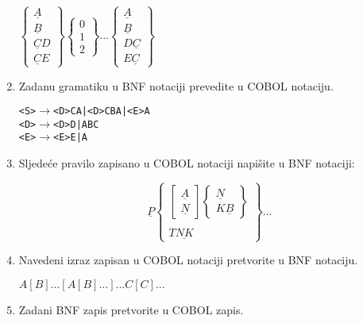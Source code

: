 \documentclass[times, 12pt, utf8]{book}
\begin{document}
\begin{enumerate}[resume]
$\begin{Bmatrix}
\underline{A}\\ 
\underline{B}\\ 
\underline{C}D\\ 
\underline{C}E
\end{Bmatrix}
\begin{Bmatrix}
0\\ 
1\\ 
2
\end{Bmatrix}
...
\begin{Bmatrix}
\underline{A}\\ 
\underline{B}\\ 
D\underline{C}\\
E\underline{C}
\end{Bmatrix}$ 

\item
Zadanu gramatiku u BNF notaciji prevedite u COBOL notaciju. \cite[str.~81-82]{udzbenik}

\begin{alltt}
<S> \(\to\) <D>CA | <D>CBA | <E>A
<D> \(\to\) <D>D | ABC
<E> \(\to\) <E>E | A
\end{alltt} 

\item
Sljedeće pravilo zapisano u COBOL notaciji napišite u BNF notaciji: \cite[str.~81-82]{udzbenik}

\[
\underline{P}
\begin{Bmatrix}
\begin{bmatrix}
\underline{A}\\ 
\underline{N}
\end{bmatrix}

\begin{Bmatrix}
\underline{N}\\ 
K\underline{B}
\end{Bmatrix}\\ 
\\
T\underline{NK}
\end{Bmatrix}
...
\] 

\item
Navedeni izraz zapisan u COBOL notaciji pretvorite u BNF notaciju. \cite[str.~81-82]{udzbenik}

\(A [B] ... [A [B] ...]...C[C]...\)

\item
Zadani BNF zapis pretvorite u COBOL zapis. \cite[str.~81-82]{udzbenik}


\end{enumerate}
\end{document}
